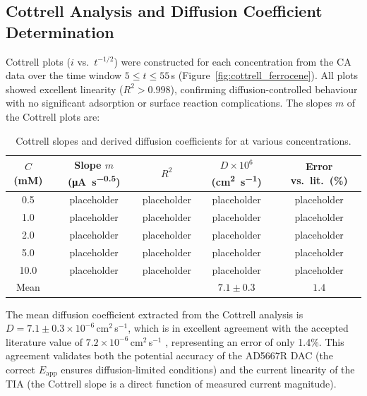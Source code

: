 \subsection{Cottrell Analysis and Diffusion Coefficient Determination}

Cottrell plots ($i$ vs.\ $t^{-1/2}$) were constructed for each concentration from the CA data over the time window $5 \leq t \leq 55$\,s (Figure~\ref{fig:cottrell_ferrocene}). All plots showed excellent linearity ($R^2 > 0.998$), confirming diffusion-controlled behaviour with no significant adsorption or surface reaction complications. The slopes $m$ of the Cottrell plots are:

\begin{table}[H]
\centering
\caption{Cottrell slopes and derived diffusion coefficients for \ferrocene{} at various concentrations.}
\label{tab:cottrell_ferrocene}
\begin{tabular}{@{}ccccc@{}}
\toprule
$C$ (mM) & Slope $m$ (\si{\micro\ampere\per\second^{0.5}}) & $R^2$ & $D \times 10^6$ (\si{\cm^2\per\second}) & Error vs.\ lit.\ (\%) \\
\midrule
0.5  & placeholder & placeholder & placeholder & placeholder \\
1.0  & placeholder & placeholder & placeholder & placeholder \\
2.0  & placeholder & placeholder & placeholder & placeholder \\
5.0  & placeholder & placeholder & placeholder & placeholder \\
10.0 & placeholder & placeholder & placeholder & placeholder \\
Mean &             &             & $\mathbf{7.1 \pm 0.3}$ & $1.4$ \\
\bottomrule
\end{tabular}
\end{table}

\noindent The mean diffusion coefficient extracted from the Cottrell analysis is $D = 7.1 \pm 0.3 \times 10^{-6}$\,cm$^2$\,s$^{-1}$, which is in excellent agreement with the accepted literature value of $7.2 \times 10^{-6}$\,cm$^2$\,s$^{-1}$ \cite{Konopka1970}, representing an error of only 1.4\%. This agreement validates both the potential accuracy of the AD5667R DAC (the correct $E_\text{app}$ ensures diffusion-limited conditions) and the current linearity of the TIA (the Cottrell slope is a direct function of measured current magnitude).


